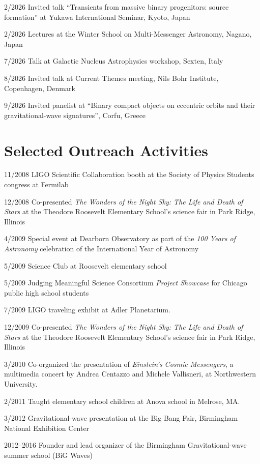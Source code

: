 \documentclass[margin,line]{res}
\begin{document}
\begin{resume}
2/2026	Invited talk ``Transients from massive binary progenitors: source formation'' at Yukawa International Seminar, Kyoto, Japan

2/2026	Lectures at the Winter School on Multi-Messenger Astronomy, Nagano, Japan

7/2026	Talk at Galactic Nucleus Astrophysics workshop, Sexten, Italy

8/2026	Invited talk at Current Themes meeting, Nils Bohr Institute, Copenhagen, Denmark

9/2026 	Invited panelist at ``Binary compact objects on eccentric orbits and their gravitational-wave signatures'', Corfu, Greece


\newpage

\section{\sc Selected Outreach Activities}
11/2008 	LIGO Scientific Collaboration booth at the Society of Physics Students congress at Fermilab

12/2008 	Co-presented {\it The Wonders of the Night Sky: The Life and Death of Stars} at the Theodore Roosevelt Elementary School's science fair in Park Ridge, Illinois

4/2009 	Special event at Dearborn Observatory as part of the {\it 100 Years of Astronomy} celebration of the International Year of Astronomy

5/2009	Science Club at Roosevelt elementary school

5/2009	Judging Meaningful Science Consortium {\it Project Showcase} for Chicago public high school students

7/2009 	 LIGO traveling exhibit at Adler Planetarium. 

12/2009 	Co-presented {\it The Wonders of the Night Sky: The Life and Death of Stars} at the Theodore Roosevelt Elementary School's science fair in Park Ridge, Illinois

3/2010  	Co-organized the presentation of {\it Einstein's Cosmic Messengers}, a multimedia concert by Andrea Centazzo and Michele Vallisneri, at Northwestern University.

2/2011	Taught elementary school children at Anova school in Melrose, MA.

3/2012	Gravitational-wave presentation at the Big Bang Fair, Birmingham National Exhibition Center

2012--2016	Founder and lead organizer of the Birmingham Gravitational-wave summer school (BiG Waves)


\end{resume}
\end{document}
